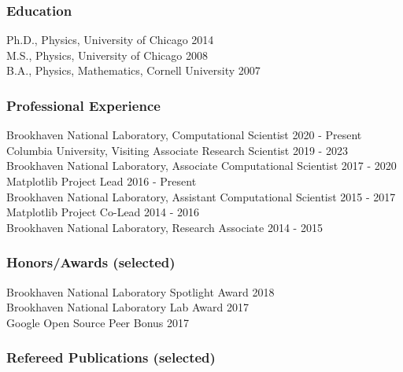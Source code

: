 \documentclass[12pt]{article}
\numberwithin{page}{section}
\begin{document}
\subsubsection*{Education}
Ph.D., Physics, University of Chicago \hfill 2014\\
M.S., Physics, University of Chicago \hfill 2008\\
B.A., Physics, Mathematics, Cornell University \hfill 2007

\subsubsection*{Professional Experience}
Brookhaven National Laboratory, Computational Scientist \hfill 2020 - Present\\
Columbia University, Visiting Associate Research Scientist \hfill 2019 - 2023 \\
Brookhaven National Laboratory, Associate Computational Scientist \hfill 2017 - 2020\\
Matplotlib Project Lead \hfill 2016 - Present\\
Brookhaven National Laboratory, Assistant Computational Scientist \hfill 2015 - 2017\\
Matplotlib Project Co-Lead \hfill 2014 - 2016\\
Brookhaven National Laboratory, Research Associate \hfill 2014 - 2015\\

\subsubsection*{Honors/Awards (selected)}
Brookhaven National Laboratory Spotlight  Award \hfill 2018\\
Brookhaven National Laboratory Lab Award \hfill 2017\\
Google Open Source Peer Bonus \hfill 2017

\subsubsection*{Refereed Publications (selected)}
\end{document}
